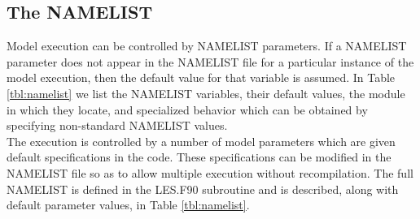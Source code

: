 \documentclass[11pt,a4paper]{article}
\begin{document}
\subsection{The NAMELIST}
Model execution can be controlled by NAMELIST parameters. If a
NAMELIST parameter does not appear in the NAMELIST file for a
particular instance of the model execution, then the default value for that
variable is assumed.  In Table \ref{tbl:namelist} we list the NAMELIST
variables, their default values, the module in which they locate, and
specialized behavior which can be obtained by specifying non-standard
NAMELIST values.
\\
The execution is controlled by a number of model parameters which are
given default specifications in the code. These specifications can be
modified in the NAMELIST file so as to allow multiple execution
without recompilation.  The full NAMELIST is defined in the LES.F90
subroutine and is described, along with default parameter values, in
Table \ref{tbl:namelist}. 
\end{document}
